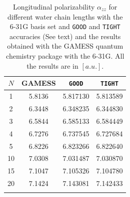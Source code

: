 \documentclass[prl,aps,letterpaper,twocolumn,showpacs,twocolumngrid,superbib]{revtex4}
\begin{document}
\begin{table}[t]
  \centering
  \caption{\protect
    Longitudinal polarizability $\alpha_{zz}$
    for different water chain lengths with the 6-31G basis set
    and {\tt GOOD} and {\tt TIGHT} accuracies (See text) and the results obtained with
    the GAMESS quantum chemistry package \cite{gamess} with the 6-31G. 
    All the results are in $[a.u.]$.
  }\label{tab:Alpha_1D_Values}
  \begin{tabular}{cccc}
    \toprule
    $N$ &\multicolumn{1}{c}{{\sc GAMESS}}
        &\multicolumn{1}{c}{{\tt GOOD}}
        &\multicolumn{1}{c}{{\tt TIGHT}}\\
    \hline
     1 & 5.8136 & 5.817130 & 5.813589  \\
     2 & 6.3448 & 6.348235 & 6.344830  \\
     3 & 6.5844 & 6.585133 & 6.584449  \\
     4 & 6.7276 & 6.737545 & 6.727684  \\
     5 & 6.8226 & 6.823266 & 6.822640  \\
    10 & 7.0308 & 7.031487 & 7.030870  \\
    15 & 7.1047 & 7.105326 & 7.104780  \\
    20 & 7.1424 & 7.143081 & 7.142433  \\
    \botrule
  \end{tabular}
\end{table}
\end{document}
